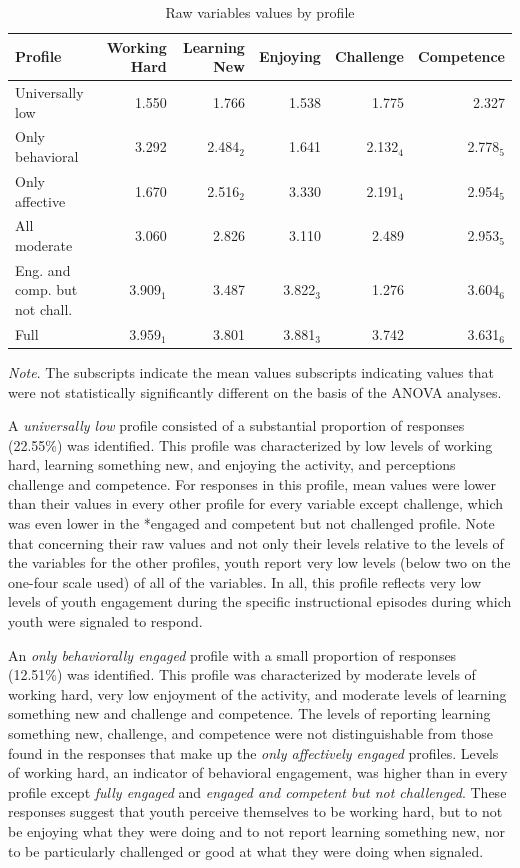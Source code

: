 \documentclass[]{msu-thesis}
\theoremstyle{definition}
\theoremstyle{definition}
\theoremstyle{definition}
\theoremstyle{remark}
\begin{document}
\begin{landscape}\begin{table}

\caption{\label{tab:unnamed-chunk-13}Raw variables values by profile}
\centering
\begin{tabular}[t]{lrrrrr}
\toprule
Profile & Working Hard & Learning New & Enjoying & Challenge & Competence\\
\midrule
Universally low & 1.550 & 1.766 & 1.538 & 1.775 & 2.327\\
Only behavioral & 3.292 & 2.484$_2$ & 1.641 & 2.132$_4$ & 2.778$_5$\\
Only affective & 1.670 & 2.516$_2$ & 3.330 & 2.191$_4$ & 2.954$_5$\\
All moderate & 3.060 & 2.826 & 3.110 & 2.489 & 2.953$_5$\\
Eng. and comp. but not chall. & 3.909$_1$ & 3.487 & 3.822$_3$ & 1.276 & 3.604$_6$\\
Full & 3.959$_1$ & 3.801 & 3.881$_3$ & 3.742 & 3.631$_6$\\
\bottomrule
\end{tabular}
\begin{flushleft}\emph{Note}. The subscripts indicate the mean values subscripts
indicating values that were not statistically significantly different on
the basis of the ANOVA analyses.\end{flushleft}
\end{table}
\end{landscape}

A \emph{universally low} profile consisted of a substantial proportion
of responses (22.55\%) was identified. This profile was characterized by
low levels of working hard, learning something new, and enjoying the
activity, and perceptions challenge and competence. For responses in
this profile, mean values were lower than their values in every other
profile for every variable except challenge, which was even lower in the
*engaged and competent but not challenged profile. Note that concerning
their raw values and not only their levels relative to the levels of the
variables for the other profiles, youth report very low levels (below
two on the one-four scale used) of all of the variables. In all, this
profile reflects very low levels of youth engagement during the specific
instructional episodes during which youth were signaled to respond.

An \emph{only behaviorally engaged} profile with a small proportion of
responses (12.51\%) was identified. This profile was characterized by
moderate levels of working hard, very low enjoyment of the activity, and
moderate levels of learning something new and challenge and competence.
The levels of reporting learning something new, challenge, and
competence were not distinguishable from those found in the responses
that make up the \emph{only affectively engaged} profiles. Levels of
working hard, an indicator of behavioral engagement, was higher than in
every profile except \emph{fully engaged} and \emph{engaged and
competent but not challenged}. These responses suggest that youth
perceive themselves to be working hard, but to not be enjoying what they
were doing and to not report learning something new, nor to be
particularly challenged or good at what they were doing when signaled.
\end{document}
